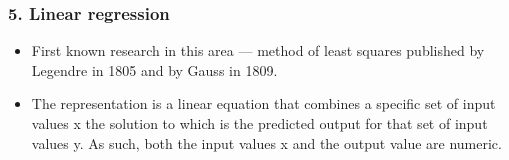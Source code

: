 \documentclass[handout,compress]{beamer} %
\begin{document}

\begin{frame}[allowframebreaks]
    \frametitle{5. Linear regression}	
    	\begin{itemize}
	\item First known research in this area --- method of least squares published by Legendre in 1805 and by Gauss in 1809.
	\item
	The representation is a linear equation that combines a specific set of input values x the solution to which is the predicted output for that set of input values y. As such, both the 		input values x and the output value are numeric.
	\end{itemize}
	\end{frame}
\end{document}

